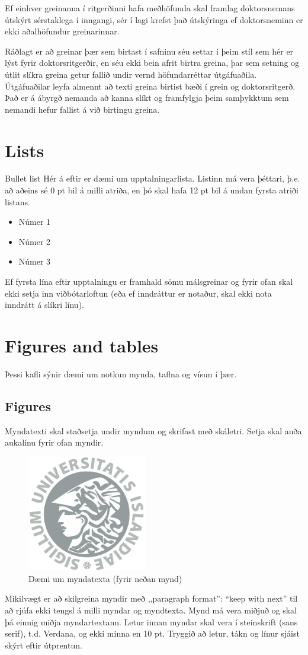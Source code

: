 \documentclass[a4paper,12pt,twoside,BCOR=10mm]{scrbook}
\begin{document}
Ef einhver greinanna í ritgerðinni hafa meðhöfunda skal framlag doktorsnemans útskýrt sérstaklega í inngangi, sér í lagi krefst það útskýringa ef doktorsneminn er ekki aðalhöfundur greinarinnar. 

Ráðlagt er að greinar þær sem birtast í safninu séu settar í þeim stíl sem hér er lýst fyrir doktorsritgerðir, en séu ekki bein afrit birtra greina, þar sem setning og útlit slíkra greina getur fallið undir vernd höfundarréttar útgáfuaðila. Útgáfuaðilar leyfa almennt að texti greina birtist bæði í grein og doktorsritgerð. Það er á ábyrgð nemanda að kanna slíkt og framfylgja þeim samþykktum sem nemandi hefur fallist á við birtingu greina.
 
\chapter{Lists}
Bullet list
Hér á eftir er dæmi um upptalningarlista. Listinn má vera þéttari, þ.e. að aðeins sé 0 pt bil á milli atriða, en þó skal hafa 12 pt bil á undan fyrsta atriði listans.
\begin{itemize}
 \item Númer 1
 \item Númer 2
 \item Númer 3
\end{itemize}
Ef fyrsta lína eftir upptalningu er framhald sömu málsgreinar og fyrir ofan skal ekki setja inn viðbótarloftun (eða ef inndráttur er notaður, skal ekki nota inndrátt á slíkri línu). 

\chapter{Figures and tables}
Þessi kafli sýnir dæmi um notkun mynda, taflna og vísun í þær.
\section{Figures}
Myndatexti skal staðsetja undir myndum og skrifast með skáletri.
Setja skal auða aukalínu fyrir ofan myndir.
\begin{figure}[!htb]
\centering
\includegraphics[width=0.47\textwidth]{UI.png}
\caption[Dæmi um myndatexta (fyrir neðan mynd).]{Dæmi um myndatexta (fyrir neðan mynd)} \label{fig:Array}
\end{figure}
Mikilvægt er að skilgreina myndir með ,,paragraph format”: “keep with next” til að rjúfa ekki tengsl á milli myndar og myndtexta. Mynd má vera miðjuð og skal þá einnig miðja myndartextann. Letur innan myndar skal vera í steinskrift (sans serif), t.d. Verdana, og ekki minna en 10 pt. Tryggið að letur, tákn og línur sjáist skýrt eftir útprentun.
\end{document}
